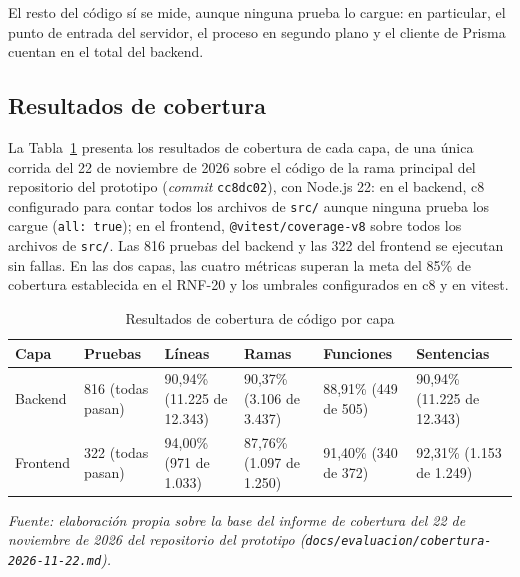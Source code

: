 El resto del código sí se mide, aunque ninguna prueba lo cargue: en particular, el punto de entrada del servidor, el proceso en segundo plano y el cliente de Prisma cuentan en el total del backend.

\subsection{Resultados de cobertura}
\label{sec:resultados-cobertura}

La Tabla~\ref{tab:resultados-cobertura} presenta los resultados de cobertura de cada capa, de una única corrida del 22 de noviembre de 2026 sobre el código de la rama principal del repositorio del prototipo (\emph{commit} \texttt{cc8dc02}), con Node.js 22: en el backend, c8 configurado para contar todos los archivos de \texttt{src/} aunque ninguna prueba los cargue (\texttt{all: true}); en el frontend, \texttt{@vitest/coverage-v8} sobre todos los archivos de \texttt{src/}. Las 816 pruebas del backend y las 322 del frontend se ejecutan sin fallas. En las dos capas, las cuatro métricas superan la meta del 85\% de cobertura establecida en el RNF-20 y los umbrales configurados en c8 y en vitest.

\begin{table}[h]
\centering
\caption{Resultados de cobertura de código por capa}
\label{tab:resultados-cobertura}
\renewcommand{\arraystretch}{1.3}
\begin{tabular}{|m{1.7cm}|m{1.9cm}|m{2.5cm}|m{2.5cm}|m{2.2cm}|m{2.5cm}|}
\hline
\textbf{Capa} & \textbf{Pruebas} & \textbf{Líneas} & \textbf{Ramas} & \textbf{Funciones} & \textbf{Sentencias} \\
\hline
Backend & 816 (todas pasan) & 90,94\% (11.225 de 12.343) & 90,37\% (3.106 de 3.437) & 88,91\% (449 de 505) & 90,94\% (11.225 de 12.343) \\
\hline
Frontend & 322 (todas pasan) & 94,00\% (971 de 1.033) & 87,76\% (1.097 de 1.250) & 91,40\% (340 de 372) & 92,31\% (1.153 de 1.249) \\
\hline
\end{tabular}

\smallskip
\noindent\textit{Fuente: elaboración propia sobre la base del informe de cobertura del 22 de noviembre de 2026 del repositorio del prototipo (\texttt{docs/evaluacion/cobertura-2026-11-22.md}).}
\end{table}


